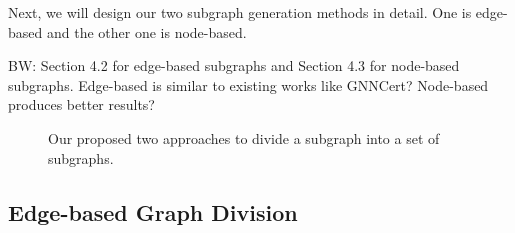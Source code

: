 Next, we will design our two subgraph generation methods in detail. One is edge-based and the other one is node-based.  


{\color{red} BW: Section 4.2 for edge-based subgraphs and Section 4.3 for node-based subgraphs. Edge-based is similar to existing works like GNNCert? Node-based produces better results? }




\begin{figure*}[t]
    \centering
    \captionsetup[subfloat]{labelsep=none, format=plain, labelformat=empty}

    \hspace{+10mm}
    \caption{Our proposed two approaches to divide a subgraph into a set of subgraphs. 
    }
    \label{fig:subgraphs}
\end{figure*}
\label{Sec:Subgraph}



\subsection{Edge-based Graph Division}

